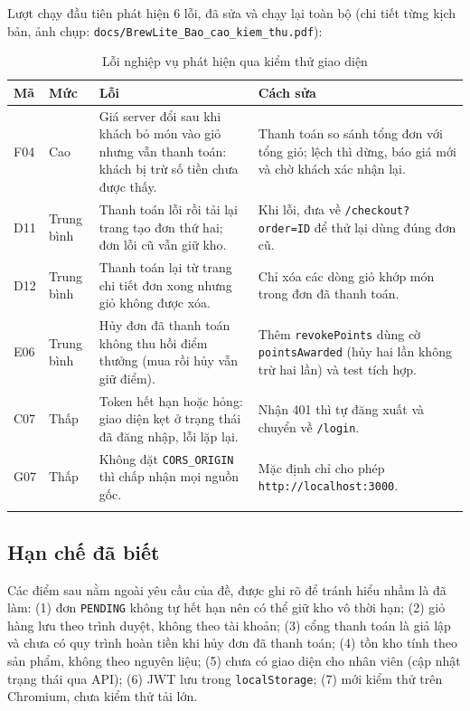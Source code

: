 \documentclass[a4paper]{article}
\newcommand{\st}[1]{\texttt{#1}}
\begin{document}
Lượt chạy đầu tiên phát hiện 6 lỗi, đã sửa và chạy lại toàn bộ (chi tiết từng kịch bản, ảnh chụp: \texttt{docs/BrewLite\_Bao\_cao\_kiem\_thu.pdf}):
\begin{longtable}{|L{0.9cm}|L{1.3cm}|L{4.2cm}|L{5.8cm}|}
\hline
\textbf{Mã} & \textbf{Mức} & \textbf{Lỗi} & \textbf{Cách sửa} \\ \hline
\endhead
F04 & Cao & Giá server đổi sau khi khách bỏ món vào giỏ nhưng vẫn thanh toán: khách bị trừ số tiền chưa được thấy. & Thanh toán so sánh tổng đơn với tổng giỏ; lệch thì dừng, báo giá mới và chờ khách xác nhận lại. \\ \hline
D11 & Trung bình & Thanh toán lỗi rồi tải lại trang tạo đơn thứ hai; đơn lỗi cũ vẫn giữ kho. & Khi lỗi, đưa về \texttt{/checkout?order=ID} để thử lại dùng đúng đơn cũ. \\ \hline
D12 & Trung bình & Thanh toán lại từ trang chi tiết đơn xong nhưng giỏ không được xóa. & Chỉ xóa các dòng giỏ khớp món trong đơn đã thanh toán. \\ \hline
E06 & Trung bình & Hủy đơn đã thanh toán không thu hồi điểm thưởng (mua rồi hủy vẫn giữ điểm). & Thêm \texttt{revokePoints} dùng cờ \texttt{pointsAwarded} (hủy hai lần không trừ hai lần) và test tích hợp. \\ \hline
C07 & Thấp & Token hết hạn hoặc hỏng: giao diện kẹt ở trạng thái đã đăng nhập, lỗi lặp lại. & Nhận 401 thì tự đăng xuất và chuyển về \texttt{/login}. \\ \hline
G07 & Thấp & Không đặt \texttt{CORS\_ORIGIN} thì chấp nhận mọi nguồn gốc. & Mặc định chỉ cho phép \texttt{http://localhost:3000}. \\ \hline
\caption{Lỗi nghiệp vụ phát hiện qua kiểm thử giao diện}
\end{longtable}

\subsection{Hạn chế đã biết}
{\sloppy Các điểm sau nằm ngoài yêu cầu của đề, được ghi rõ để tránh hiểu nhầm là đã làm: (1) đơn \st{PENDING} không tự hết hạn nên có thể giữ kho vô thời hạn; (2) giỏ hàng lưu theo trình duyệt, không theo tài khoản; (3) cổng thanh toán là giả lập và chưa có quy trình hoàn tiền khi hủy đơn đã thanh toán; (4) tồn kho tính theo sản phẩm, không theo nguyên liệu; (5) chưa có giao diện cho nhân viên (cập nhật trạng thái qua API); (6) JWT lưu trong \texttt{localStorage}; (7) mới kiểm thử trên Chromium, chưa kiểm thử tải lớn.\par}
\end{document}

